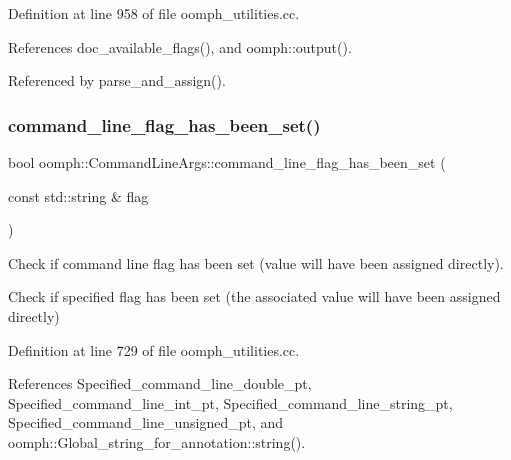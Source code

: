 Definition at line 958 of file oomph\+\_\+utilities.\+cc.



References doc\+\_\+available\+\_\+flags(), and oomph\+::output().



Referenced by parse\+\_\+and\+\_\+assign().

\mbox{\label{namespaceoomph_1_1CommandLineArgs_a4127f6d5354aa20af7e5ff55c14a4419}} 
\subsubsection{\texorpdfstring{command\+\_\+line\+\_\+flag\+\_\+has\+\_\+been\+\_\+set()}{command\_line\_flag\_has\_been\_set()}}
{\footnotesize\ttfamily bool oomph\+::\+Command\+Line\+Args\+::command\+\_\+line\+\_\+flag\+\_\+has\+\_\+been\+\_\+set (\begin{DoxyParamCaption}\item[{const std\+::string \&}]{flag }\end{DoxyParamCaption})}



Check if command line flag has been set (value will have been assigned directly). 

Check if specified flag has been set (the associated value will have been assigned directly) 

Definition at line 729 of file oomph\+\_\+utilities.\+cc.



References Specified\+\_\+command\+\_\+line\+\_\+double\+\_\+pt, Specified\+\_\+command\+\_\+line\+\_\+int\+\_\+pt, Specified\+\_\+command\+\_\+line\+\_\+string\+\_\+pt, Specified\+\_\+command\+\_\+line\+\_\+unsigned\+\_\+pt, and oomph\+::\+Global\+\_\+string\+\_\+for\+\_\+annotation\+::string().

\mbox{\label{namespaceoomph_1_1CommandLineArgs_a5b126e4b3314fd7971ed876b89fc0d94}} 
